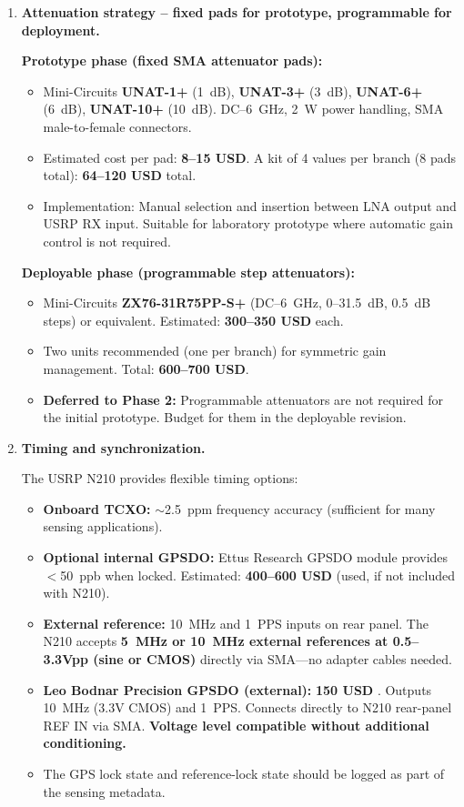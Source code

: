 \documentclass[11pt,a4paper]{article}
\newcommand{\blue}[1]{\textcolor{priceblue}{\textbf{#1}}}
\newcommand{\gc}{\textbullet}
\begin{document}
\begin{enumerate}[label=\roman*)]
		\item \textbf{Attenuation strategy -- fixed pads for prototype, programmable for deployment.}
		
		\textbf{Prototype phase (fixed SMA attenuator pads):}
		\begin{itemize}
			\item Mini-Circuits \textbf{UNAT-1+} (1~dB), \textbf{UNAT-3+} (3~dB),
			\textbf{UNAT-6+} (6~dB), \textbf{UNAT-10+} (10~dB). DC--6~GHz, 2~W power
			handling, SMA male-to-female connectors.
			\item Estimated cost per pad: \blue{8--15 USD}. A kit of 4 values per branch
			(8 pads total): \blue{64--120 USD} total.
			\item Implementation: Manual selection and insertion between LNA output and
			USRP RX input. Suitable for laboratory prototype where automatic gain control
			is not required.
		\end{itemize}
		
		\textbf{Deployable phase (programmable step attenuators):}
		\begin{itemize}
			\item Mini-Circuits \textbf{ZX76-31R75PP-S+} (DC--6~GHz, 0--31.5~dB, 0.5~dB
			steps) or equivalent. Estimated: \blue{300--350 USD} each.
			\item Two units recommended (one per branch) for symmetric gain management.
			Total: \blue{600--700 USD}.
			\item \textbf{Deferred to Phase 2:} Programmable attenuators are not required
			for the initial prototype. Budget for them in the deployable revision.
		\end{itemize}
		
		\item \textbf{Timing and synchronization.}
		
		The USRP N210 provides flexible timing options:
		\begin{itemize}
			\item \textbf{Onboard TCXO:} $\sim$2.5~ppm frequency accuracy (sufficient
			for many sensing applications).
			\item \textbf{Optional internal GPSDO:} Ettus Research GPSDO module provides
			$<$50~ppb when locked. Estimated: \blue{400--600 USD} (used, if not included
			with N210).
			\item \textbf{External reference:} 10~MHz and 1~PPS inputs on rear panel.
			The N210 accepts \textbf{5~MHz or 10~MHz external references at 0.5--3.3Vpp
				(sine or CMOS)} directly via SMA---no adapter cables needed.
			\item \textbf{Leo Bodnar Precision GPSDO (external):} \blue{150 USD}
			\href{https://leobodnar.com/shop/index.php?main_page=product_info\&products_id=301}{\gc}.
			Outputs 10~MHz (3.3V CMOS) and 1~PPS. Connects directly to N210 rear-panel
			REF IN via SMA. \textbf{Voltage level compatible without additional conditioning.}
			\item The GPS lock state and reference-lock state should be logged as part of
			the sensing metadata.
		\end{itemize}
		
	\end{enumerate}
	
\end{document}
